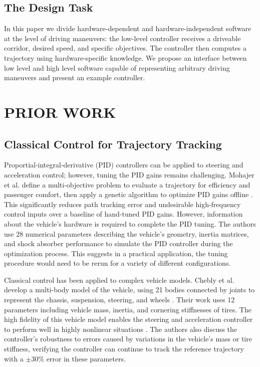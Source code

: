 \documentclass[letterpaper, 10 pt, conference]{ieeeconf}  %
\begin{document}
\subsection{The Design Task}
In this paper we divide hardware-dependent and hardware-independent software at the level of driving maneuvers: the low-level controller receives a driveable corridor, desired speed, and specific objectives. The controller then computes a trajectory using hardware-specific knowledge. We propose an interface between low level and high level software capable of representing arbitrary driving maneuvers and present an example controller.

\section{PRIOR WORK}

\subsection{Classical Control for Trajectory Tracking}
Proportial-integral-derivative (PID) controllers can be applied to steering and acceleration control; however, tuning the PID gains remains challenging. Mohajer et al. define a multi-objective problem to evaluate a trajectory for efficiency and passenger comfort, then apply a genetic algorithm to optimize PID gains offline \cite{pid}. This significantly reduces path tracking error and undesirable high-frequency control inputs over a baseline of hand-tuned PID gains. However, information about the vehicle's hardware is required to complete the PID tuning. The authors use 28 numerical parameters describing the vehicle's geometry, inertia matrices, and shock absorber performance to simulate the PID controller during the optimization process. This suggests in a practical application, the tuning procedure would need to be rerun for a variety of different configurations.


Classical control has been applied to complex vehicle models. Chebly et al. develop a multi-body model of the vehicle, using 21 bodies connected by joints to represent the chassis, suspension, steering, and wheels \cite{CHEBLY201712526}. Their work uses 12 parameters including vehicle mass, inertia, and cornering stiffnesses of tires. The high fidelity of this vehicle model enables the steering and acceleration controller to perform well in highly nonlinear situations \cite{CHEBLY201712526}. The authors also discuss the controller's robustness to errors caused by variations in the vehicle's mass or tire stiffness, verifying the controller can continue to track the reference trajectory with a $\pm30\%$ error in these parameters.
\end{document}
